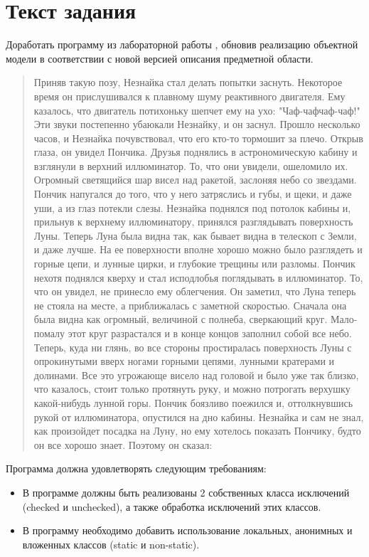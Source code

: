 \section{Текст задания}
Доработать программу из лабораторной работы , обновив реализацию объектной модели
в соответствии с новой версией описания предметной области.
\begin{quote}
Приняв такую позу, Незнайка стал делать попытки заснуть. Некоторое время он прислушивался к плавному шуму реактивного двигателя. Ему казалось, что двигатель потихоньку шепчет ему на ухо: "Чаф-чафчаф-чаф!" Эти звуки постепенно убаюкали Незнайку, и он заснул. Прошло несколько часов, и Незнайка почувствовал, что его кто-то тормошит за плечо. Открыв глаза, он увидел Пончика. Друзья поднялись в астрономическую кабину и взглянули в верхний иллюминатор. То, что они увидели, ошеломило их. Огромный светящийся шар висел над ракетой, заслоняя небо со звездами. Пончик напугался до того, что у него затряслись и губы, и щеки, и даже уши, а из глаз потекли слезы. Незнайка поднялся под потолок кабины и, прильнув к верхнему иллюминатору, принялся разглядывать поверхность Луны. Теперь Луна была видна так, как бывает видна в телескоп с Земли, и даже лучше. На ее поверхности вполне хорошо можно было разглядеть и горные цепи, и лунные цирки, и глубокие трещины или разломы. Пончик нехотя поднялся кверху и стал исподлобья поглядывать в иллюминатор. То, что он увидел, не принесло ему облегчения. Он заметил, что Луна теперь не стояла на месте, а приближалась с заметной скоростью. Сначала она была видна как огромный, величиной с полнеба, сверкающий круг. Мало-помалу этот круг разрастался и в конце концов заполнил собой все небо. Теперь, куда ни глянь, во все стороны простиралась поверхность Луны с опрокинутыми вверх ногами горными цепями, лунными кратерами и долинами. Все это угрожающе висело над головой и было уже так близко, что казалось, стоит только протянуть руку, и можно потрогать верхушку какой-нибудь лунной горы. Пончик боязливо поежился и, оттолкнувшись рукой от иллюминатора, опустился на дно кабины. Незнайка и сам не знал, как произойдет посадка на Луну, но ему хотелось показать Пончику, будто он все хорошо знает. Поэтому он сказал:
\end{quote}

Программа должна удовлетворять следующим требованиям:

\begin{itemize}
    \item В программе должны быть реализованы 2 собственных класса исключений (checked и unchecked), а также обработка исключений этих классов.
    \item В программу необходимо добавить использование локальных, анонимных и вложенных классов (static и non-static).
\end{itemize}
